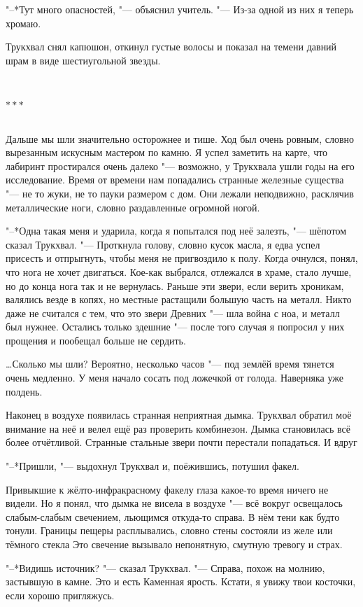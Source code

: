 \documentclass[a4paper,10pt]{book}
\newcommand{\ldotst}{\so{...}\xspace}
\newcommand{\razd}{~\\{\centering\Large\bfseries$\ast \ast \ast$\par}~\\}
\begin{document}
"--*Тут много опасностей, "--- объяснил учитель. "--- Из-за одной из них я 
теперь хромаю.

Трукхвал снял капюшон, откинул густые волосы и показал на темени давний шрам в 
виде шестиугольной звезды.

\razd

Дальше мы шли значительно осторожнее и тише. Ход был очень ровным, словно 
вырезанным искусным мастером по камню. Я успел заметить на карте, что лабиринт 
простирался очень далеко "--- возможно, у Трукхвала ушли годы на его 
исследование. Время от времени нам попадались странные железные существа "--- 
не то жуки, не то пауки размером с дом. Они лежали неподвижно, расклячив 
металлические ноги, словно раздавленные огромной ногой.

"--*Одна такая меня и ударила, когда я попытался под неё залезть, "--- шёпотом 
сказал Трукхвал. "--- Проткнула голову, словно кусок масла, я едва успел 
присесть и отпрыгнуть, чтобы меня не пригвоздило к полу. Когда очнулся, понял, 
что нога не хочет двигаться. Кое-как выбрался, отлежался в храме, стало лучше, 
но до конца нога так и не вернулась. Раньше эти звери, если верить хроникам, 
валялись везде в копях, но местные растащили большую часть на металл. Никто 
даже не считался с тем, что это звери Древних "--- шла война с ноа, и металл 
был нужнее. Остались только здешние "--- после того случая я попросил у них 
прощения и пообещал больше не сердить.

\dots Сколько мы шли? Вероятно, несколько часов "--- под землёй время тянется 
очень медленно. У меня начало сосать под ложечкой от голода. Наверняка уже 
полдень.

Наконец  в воздухе появилась странная неприятная дымка. Трукхвал обратил моё 
внимание на неё и велел ещё раз проверить комбинезон. Дымка становилась всё 
более отчётливой. Странные стальные звери почти перестали попадаться. И 
вдруг\ldotst

"--*Пришли, "--- выдохнул Трукхвал и, поёжившись, потушил факел.

Привыкшие к жёлто-инфракрасному факелу глаза какое-то время ничего не видели. 
Но я понял, что дымка не висела в воздухе "--- всё вокруг освещалось 
слабым-слабым свечением, льющимся откуда-то справа. В нём тени как будто 
тонули. Границы пещеры расплывались, словно стены состояли из желе или тёмного 
стекла\ldotst Это свечение вызывало непонятную, смутную тревогу и страх.

"--*Видишь источник? "--- сказал Трукхвал. "--- Справа, похож на молнию, 
застывшую в камне. Это и есть Каменная ярость. Кстати, я увижу твои косточки, 
если хорошо пригляжусь.
\end{document}
